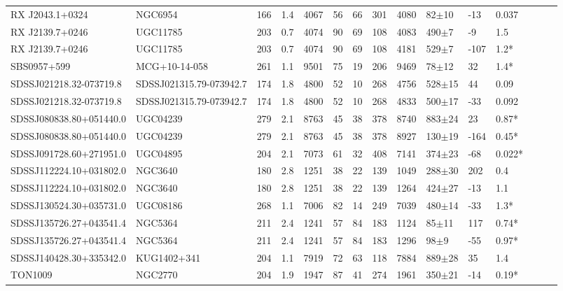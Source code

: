 \documentclass[twocolumn,tighten]{aastex6}
\begin{document}
\begin{table}[ht]
\begin{center}
\begin{tabular}{l l l l l l l l l l l l l l l}
RX J2043.1+0324  			&  NGC6954  					&  166  & 1.4 &  4067  	&  56  &  66  	&  301  &  4080  	&  82$\pm$10  		&  -13  	&  0.037  \\
RX J2139.7+0246  			&  UGC11785  					&  203  & 0.7 &  4074  	&  90  &  69  	&  108  &  4083  	&  490$\pm$7  		&  -9  	&  1.5  \\
RX J2139.7+0246  			&  UGC11785  					&  203  & 0.7 &  4074  	&  90  &  69  	&  108  &  4181  	&  529$\pm$7  		&  -107  	&  1.2*  \\
SBS0957+599  			&  MCG+10-14-058  				&  261  & 1.1 &  9501  	&  75  &  19  	&  206  &  9469  	&  78$\pm$12  		&  32  	&  1.4*  \\
SDSSJ021218.32-073719.8  	&  SDSSJ021315.79-073942.7  	&  174  & 1.8 &  4800  	&  52  &  10  	&  268  &  4756  	&  528$\pm$15  	&  44  	&  0.09  \\
SDSSJ021218.32-073719.8  	&  SDSSJ021315.79-073942.7  	&  174  & 1.8 &  4800  	&  52  &  10  	&  268  &  4833  	&  500$\pm$17  	&  -33  	&  0.092  \\
SDSSJ080838.80+051440.0  	&  UGC04239  					&  279  & 2.1 &  8763  	&  45  &  38  	&  378  &  8740  	&  883$\pm$24  	&  23  	&  0.87*  \\
SDSSJ080838.80+051440.0  	&  UGC04239  					&  279  & 2.1 &  8763  	&  45  &  38  	&  378  &  8927  	&  130$\pm$19  	&  -164  	&  0.45*  \\
SDSSJ091728.60+271951.0  	&  UGC04895  					&  204  & 2.1 &  7073  	&  61  &  32  	&  408  &  7141  	&  374$\pm$23  	&  -68  	&  0.022*  \\
SDSSJ112224.10+031802.0  	&  NGC3640  					&  180  & 2.8 &  1251  	&  38  &  22  	&  139  &  1049  	&  288$\pm$30  	&  202  	&  0.4  \\
SDSSJ112224.10+031802.0  	&  NGC3640  					&  180  & 2.8 &  1251  	&  38  &  22  	&  139  &  1264  	&  424$\pm$27  	&  -13  	&  1.1  \\
SDSSJ130524.30+035731.0  	&  UGC08186  					&  268  & 1.1 &  7006  	&  82  &  14  	&  249  &  7039  	&  480$\pm$14  	&  -33  	&  1.3*  \\
SDSSJ135726.27+043541.4  	&  NGC5364  					&  211  & 2.4 &  1241  	&  57  &  84  	&  183  &  1124  	&  85$\pm$11  		&  117  	&  0.74*  \\
SDSSJ135726.27+043541.4  	&  NGC5364  					&  211  & 2.4 &  1241  	&  57  &  84  	&  183  &  1296  	&  98$\pm$9  		&  -55  	&  0.97*  \\
SDSSJ140428.30+335342.0  	&  KUG1402+341  				&  204  & 1.1 &  7919  	&  72  &  63  	&  118  &  7884  	&  889$\pm$28  	&  35  	&  1.4  \\
TON1009  				&  NGC2770  					&  204  & 1.9 &  1947  	&  87  &  41  	&  274  &  1961  	&  350$\pm$21 	&  -14  	&  0.19*  \\


\end{tabular}
\end{center}
\end{table}
\end{document}
